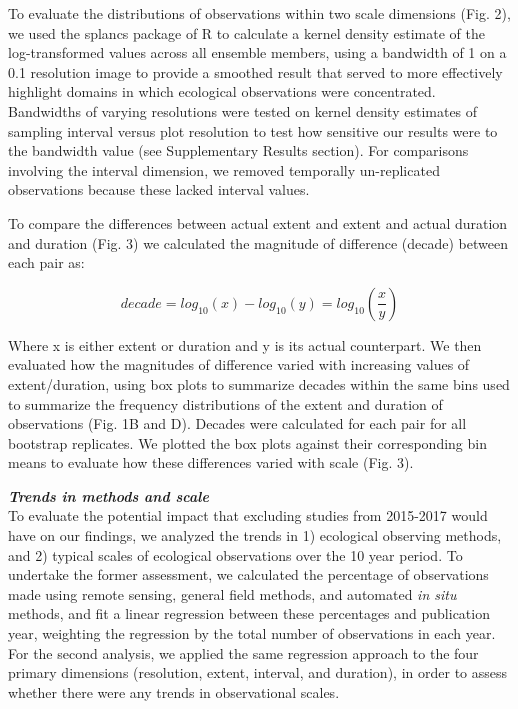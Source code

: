 \documentclass[12pt]{article}
\begin{document}
To evaluate the distributions of observations within two scale dimensions (Fig. 2), we used the splancs package \cite{rowlingson_splancs:_1993} of R \cite{r_development_core_team_r:_2011} to calculate a kernel density estimate of the log-transformed values across all ensemble members, using a bandwidth of 1 on a 0.1 resolution image to provide a smoothed result that served to more effectively highlight domains in which ecological observations were concentrated. Bandwidths of varying resolutions were tested on kernel density estimates of sampling interval versus plot resolution to test how sensitive our results were to the bandwidth value (see Supplementary Results section). For comparisons involving the interval dimension, we removed temporally un-replicated observations because these lacked interval values. 

To compare the differences between actual extent and extent and actual duration and duration (Fig. 3) we calculated the magnitude of difference (decade) between each pair as:

\begin{equation}
decade = log_{10}(x) - log_{10}(y) = log_{10}\left(\frac{x}{y}\right)
\end{equation}

\noindent Where x is either extent or duration and y is its actual counterpart. We then evaluated how the magnitudes of difference varied with increasing values of extent/duration, using box plots to summarize decades within the same bins used to summarize the frequency distributions of the extent and duration of observations (Fig. 1B and D). Decades were calculated for each pair for all bootstrap replicates. We plotted the box plots against their corresponding bin means to evaluate how these differences varied with scale (Fig. 3).

\vspace{5pt}
\noindent \textbf{\emph{Trends in methods and scale}}\\
To evaluate the potential impact that excluding studies from 2015-2017 would have on our findings, we analyzed the trends in 1) ecological observing methods, and 2) typical scales of ecological observations over the 10 year period. To undertake the former assessment, we calculated the percentage of observations made using remote sensing, general field methods, and automated \emph{in situ} methods, and fit a linear regression between these percentages and publication year, weighting the regression by the total number of observations in each year. For the second analysis, we applied the same regression approach to the four primary dimensions (resolution, extent, interval, and duration), in order to assess whether there were any trends in observational scales.  
\end{document}
